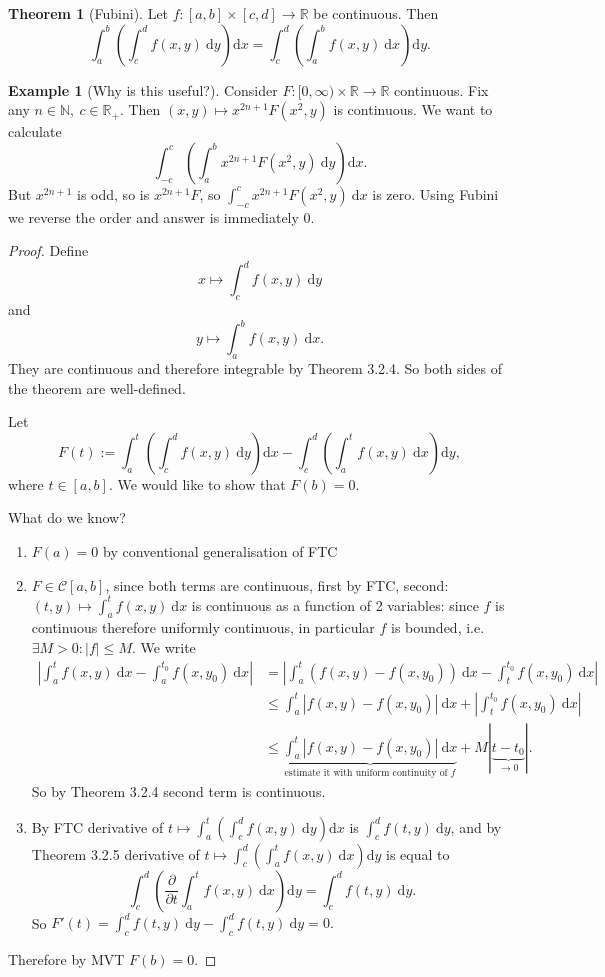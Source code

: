 \documentclass[a4paper]{article}
\theoremstyle{definition}
\newtheorem{thm}[defn]{Theorem}
\newtheorem{example}[defn]{Example}
\begin{document}
\begin{thm}[Fubini]
Let $f:[a,b]\times [c,d] \rightarrow \mathbb R$ be continuous. Then
\[
\int_a^b \left(\int_c^d f(x,y) \ \mathrm d y\right)\mathrm d x=\int_c^d \left(\int_a^b f(x,y) \ \mathrm d x\right)\mathrm d y .
\]
\end{thm}
\begin{example}[Why is this useful?]
Consider $F:[0,\infty ) \times \mathbb R \rightarrow \mathbb R$ continuous. Fix any $n\in \mathbb N, \ c\in \mathbb R_+$. Then $(x,y)\mapsto x^{2n+1}F(x^2,y)$ is continuous. We want to calculate
\[
\int_{-c}^c \left(\int_a^b x^{2n+1}F(x^2,y) \ \mathrm d y\right) \mathrm d x .
\]
But $x^{2n+1}$ is odd, so is $x^{2n+1}F$, so $\int_{-c}^c x^{2n+1}F(x^2,y) \ \mathrm d x$ is zero. Using Fubini we reverse the order and answer is immediately 0.
\end{example}
\begin{proof}
Define
\[
x\mapsto \int_c^d f(x,y) \ \mathrm d y
\]
and
\[
y\mapsto \int_a^b f(x,y) \ \mathrm d x .
\]
They are continuous and therefore integrable by Theorem 3.2.4. So both sides of the theorem are well-defined.

Let
\[
F(t):=\int_a^t \left( \int_c^d f(x,y) \ \mathrm d y\right) \mathrm d x-\int_c^d \left(\int_a^t f(x,y) \ \mathrm d x\right) \mathrm d y,
\]
where $t\in [a,b]$. We would like to show that $F(b)=0$.

What do we know?
\begin{enumerate}
    \item $F(a)=0$ by conventional generalisation of FTC
    \item $F\in \mathcal C[a,b]$, since both terms are continuous, first by FTC, second: $(t,y)\mapsto \int_a^t f(x,y) \ \mathrm d x$ is continuous as a function of 2 variables: since $f$ is continuous therefore uniformly continuous, in particular $f$ is bounded, i.e. $\exists M>0: |f|\leq M$. We write
\[
\begin{aligned}\left|\int_a^t f(x,y) \ \mathrm d x - \int_a^{t_0} f(x,y_0) \ \mathrm d x \right|&=\left|\int_a^t (f(x,y)-f(x,y_0)) \ \mathrm d x -\int_t^{t_0} f(x,y_0) \ \mathrm d x\right|\\&\leq \int_a^t |f(x,y)-f(x,y_0)| \ \mathrm d x + \left|\int_t^{t_0}f(x,y_0) \ \mathrm d x \right| \\ &\leq \underbrace{\int_a^t |f(x,y) -f(x,y_0)| \ \mathrm d x}_{\text{estimate it with uniform continuity of }f} + M|\underbrace{t-t_0}_{\rightarrow 0}| . \end{aligned}
\]
So by Theorem 3.2.4 second term is continuous.
    \item By FTC derivative of $t\mapsto \int_a^t \left( \int_c^d f(x,y) \ \mathrm d y\right) \mathrm d x$ is $\int_c^d f(t,y) \ \mathrm d y$, and by Theorem 3.2.5 derivative of $t\mapsto \int_c^d \left(\int_a^t f(x,y) \ \mathrm d x \right) \mathrm d y$ is equal to
\[
\int_c^d \left(\frac{\partial}{\partial t} \int_a^t f(x,y) \ \mathrm d x \right) \mathrm d y =\int_c^d f(t,y) \ \mathrm d y.
\]
So $F'(t) = \int_c^d f(t,y) \ \mathrm d y-\int_c^d f(t,y) \ \mathrm d y=0.$
\end{enumerate}
Therefore by MVT $F(b)=0$.
\end{proof}
\end{document}
